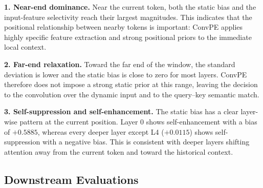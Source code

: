 \documentclass{article}
\begin{document}
\textbf{1. Near-end dominance.}
Near the current token, both the static bias and the input-feature selectivity reach their largest magnitudes. This indicates that the positional relationship between nearby tokens is important: ConvPE applies highly specific feature extraction and strong positional priors to the immediate local context.

\textbf{2. Far-end relaxation.}
Toward the far end of the window, the standard deviation is lower and the static bias is close to zero for most layers. ConvPE therefore does not impose a strong static prior at this range, leaving the decision to the convolution over the dynamic input and to the query--key semantic match.

\textbf{3. Self-suppression and self-enhancement.}
The static bias has a clear layer-wise pattern at the current position. Layer 0 shows self-enhancement with a bias of $+0.5885$, whereas every deeper layer except L4 ($+0.0115$) shows self-suppression with a negative bias. This is consistent with deeper layers shifting attention away from the current token and toward the historical context.

\subsection{Downstream Evaluations}
\label{sec:eval}
\end{document}
